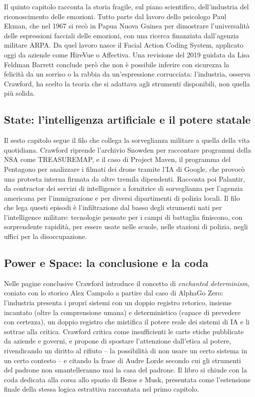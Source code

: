 \documentclass[a4paper,11pt]{article}
\begin{document}
Il quinto capitolo racconta la storia fragile, sul piano scientifico, dell'industria del riconoscimento delle emozioni. Tutto parte dal lavoro dello psicologo Paul Ekman, che nel 1967 si recò in Papua Nuova Guinea per dimostrare l'universalità delle espressioni facciali delle emozioni, con una ricerca finanziata dall'agenzia militare ARPA. Da quel lavoro nasce il Facial Action Coding System, applicato oggi da aziende come HireVue o Affectiva. Una revisione del 2019 guidata da Lisa Feldman Barrett conclude però che non è possibile inferire con sicurezza la felicità da un sorriso o la rabbia da un'espressione corrucciata: l'industria, osserva Crawford, ha scelto la teoria che si adattava agli strumenti disponibili, non quella più solida.

\subsection{State: l'intelligenza artificiale e il potere statale}

Il sesto capitolo segue il filo che collega la sorveglianza militare a quella della vita quotidiana. Crawford riprende l'archivio Snowden per raccontare programmi della NSA come TREASUREMAP, e il caso di Project Maven, il programma del Pentagono per analizzare i filmati dei drone tramite l'IA di Google, che provocò una protesta interna firmata da oltre tremila dipendenti. Racconta poi Palantir, da contractor dei servizi di intelligence a fornitrice di sorveglianza per l'agenzia americana per l'immigrazione e per diversi dipartimenti di polizia locali. Il filo che lega questi episodi è l'infiltrazione dal basso degli strumenti nati per l'intelligence militare: tecnologie pensate per i campi di battaglia finiscono, con sorprendente rapidità, per essere usate nelle scuole, nelle stazioni di polizia, negli uffici per la disoccupazione.

\subsection{Power e Space: la conclusione e la coda}

Nelle pagine conclusive Crawford introduce il concetto di \emph{enchanted determinism}, coniato con lo storico Alex Campolo a partire dal caso di AlphaGo Zero: l'industria presenta i propri sistemi con un doppio registro retorico, insieme incantato (oltre la comprensione umana) e deterministico (capace di prevedere con certezza), un doppio registro che mistifica il potere reale dei sistemi di IA e li sottrae alla critica. Crawford critica come insufficienti le carte etiche pubblicate da aziende e governi, e propone di spostare l'attenzione dall'etica al potere, rivendicando un diritto al rifiuto -- la possibilità di non usare un certo sistema in un certo contesto -- e citando la frase di Audre Lorde secondo cui gli strumenti del padrone non smantelleranno mai la casa del padrone. Il libro si chiude con la coda dedicata alla corsa allo spazio di Bezos e Musk, presentata come l'estensione finale della stessa logica estrattiva raccontata nel primo capitolo.
\end{document}
